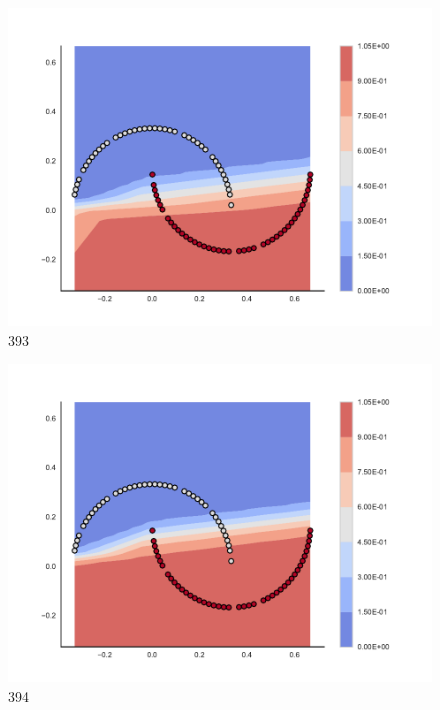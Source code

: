 \begin{subfigure}[b]{0.09\textwidth}
    \includegraphics[clip, trim=2.35cm 1.75cm 4.5cm 0cm,width=\textwidth]{img/convergence/393.pdf}
    \caption{393}
    \label{fig:convergence_393}
\end{subfigure}
%
\begin{subfigure}[b]{0.09\textwidth}
    \includegraphics[clip, trim=2.35cm 1.75cm 4.5cm 0cm,width=\textwidth]{img/convergence/394.pdf}
    \caption{394}
    \label{fig:convergence_394}
\end{subfigure}
%
